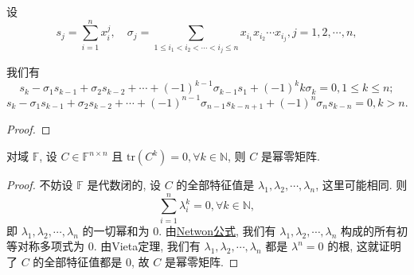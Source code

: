 \documentclass[../../main.tex]{subfiles}
\begin{document}
\begin{lemma}[Netwon公式]\label{lemma:Netwon公式}
设
\[
s_j = \sum_{i=1}^n x_i^j, \quad \sigma_j = \sum_{1 \leqslant i_1 < i_2 < \cdots < i_j \leqslant n} x_{i_1}x_{i_2} \cdots x_{i_j}, j = 1, 2, \cdots, n,
\]

我们有
\[
s_k - \sigma_1 s_{k - 1} + \sigma_2 s_{k - 2} + \cdots + (-1)^{k - 1} \sigma_{k - 1} s_1 + (-1)^k k \sigma_k = 0, 1 \leqslant k \leqslant n;
\]
\[
s_k - \sigma_1 s_{k - 1} + \sigma_2 s_{k - 2} + \cdots + (-1)^{n - 1} \sigma_{n - 1} s_{k - n + 1} + (-1)^n \sigma_n s_{k - n} = 0, k > n.
\]
\end{lemma}
\begin{proof}

\end{proof}

\begin{theorem}\label{theorem:任意次迹零就是幂零矩阵}
对域 \( \mathbb{F} \), 设 \( C \in \mathbb{F}^{n \times n} \) 且 \( \mathrm{tr}(C^k) = 0, \forall k \in \mathbb{N} \), 则 \( C \) 是幂零矩阵.
\end{theorem}
\begin{proof}
不妨设 \( \mathbb{F} \) 是代数闭的, 设 \( C \) 的全部特征值是 \( \lambda_1, \lambda_2, \cdots, \lambda_n \), 这里可能相同. 则
\[
\sum_{i=1}^n \lambda_i^k = 0, \forall k \in \mathbb{N},
\]
即 \( \lambda_1, \lambda_2, \cdots, \lambda_n \) 的一切幂和为 0. 由\hyperref[lemma:Netwon公式]{Netwon公式}, 我们有 \( \lambda_1, \lambda_2, \cdots, \lambda_n \) 构成的所有初等对称多项式为 0. 由Vieta定理, 我们有 \( \lambda_1, \lambda_2, \cdots, \lambda_n \) 都是 \( \lambda^n = 0 \) 的根, 这就证明了 \( C \) 的全部特征值都是 0, 故 \( C \) 是幂零矩阵.
\end{proof}
\end{document}
